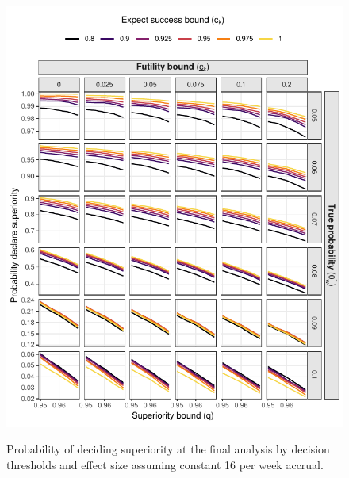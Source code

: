 \documentclass{bmcart}
\begin{document}
\begin{figure}[!ht]
	\caption{Probability of deciding superiority at the final analysis by decision thresholds and effect size assuming constant 16 per week accrual.}
	\includegraphics{figures/superiority_16.pdf}
	\label{fig:superiority_16}
\end{figure}
\end{document}
